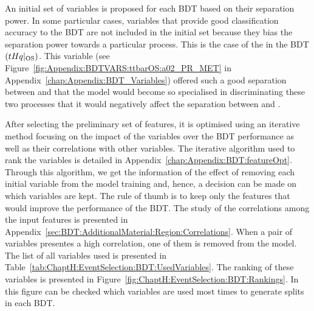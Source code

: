 An initial set of variables is proposed for each BDT based on their separation power.
In some particular cases, variables that provide good classification accuracy to the BDT are 
not included in the initial set because they bias the separation power towards a particular process.
This is the case of the \MET in the BDT$(tHq|_{\text{OS}})$. This variable 
(see Figure~\ref{fig:Appendix:BDTVARS:ttbarOS:a02_PR_MET} in Appendix~\ref{chap:Appendix:BDT_Variables}) offered such a good
separation between \Zjets and \tHq that the model would become so specialised in discriminating
these two processes that it would negatively affect the separation between \tHq and \ttbar.

After selecting the preliminary set of features, it is optimised using an iterative method focusing on the impact of the variables
over the BDT performance as well as their correlations with other variables. The iterative algorithm used to rank the variables 
is detailed in Appendix~\ref{chap:Appendix:BDT:featureOpt}.
Through this algorithm, we get the information of the effect of removing each initial variable from the model training and, hence,
a decision can be made on which variables are kept. The rule of thumb is to keep only the features that would improve the
performance of the BDT.
The study of the correlations among the input features is presented in Appendix~\ref{sec:BDT:AdditionalMaterial:Region:Correlations}.
When a pair of variables presentes a high correlation, one of them is removed from the model.
The list of all variables used is presented 
in Table~\ref{tab:ChaptH:EventSelection:BDT:UsedVariables}.
The ranking of these variables is presented in Figure~\ref{fig:ChaptH:EventSelection:BDT:Rankings}.
In this figure can be checked which variables are used most times to generate splits in each BDT.





